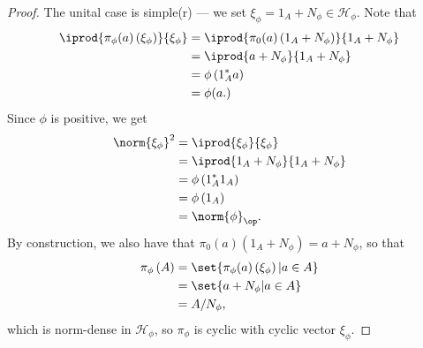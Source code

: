 \documentclass[10pt]{mypackage}
\begin{document}
\begin{proof}
  The unital case is simple(r) --- we set $\xi_{\phi} = 1_A + N_{\phi}\in \mathcal{H}_{\phi}$. Note that
  \begin{align*}
    \iprod{\pi_{\phi}(a)\left(\xi_{\phi}\right)}{\xi_{\phi}} &= \iprod{\pi_0(a)\left(1_A + N_{\phi}\right)}{1_A + N_{\phi}}\\
                                                             &= \iprod{a + N_{\phi}}{1_A + N_{\phi}}\\
                                                             &= \phi\left(1_A^{\ast}a\right)\\
                                                             &= \phi(a.)
  \end{align*}
  Since $\phi$ is positive, we get
  \begin{align*}
    \norm{\xi_{\phi}}^2 &= \iprod{\xi_{\phi}}{\xi_{\phi}}\\
                        &= \iprod{1_A + N_{\phi}}{1_A + N_{\phi}}\\
                        &= \phi\left(1_A^{\ast}1_A\right)\\
                        &= \phi\left(1_A\right)\\
                        &= \norm{\phi}_{\op}.
  \end{align*}
  By construction, we also have that $\pi_0(a)\left(1_A + N_{\phi}\right) = a + N_{\phi}$, so that
  \begin{align*}
    \pi_{\phi}\left(A\right) &= \set{\pi_{\phi}(a)\left(\xi_{\phi}\right) | a\in A}\\
                             &= \set{a + N_{\phi} | a\in A}\\
                             &= A/N_{\phi},
  \end{align*}
  which is norm-dense in $\mathcal{H}_{\phi}$, so $\pi_{\phi}$ is cyclic with cyclic vector $\xi_{\phi}$.\newline


\end{proof}
\end{document}
